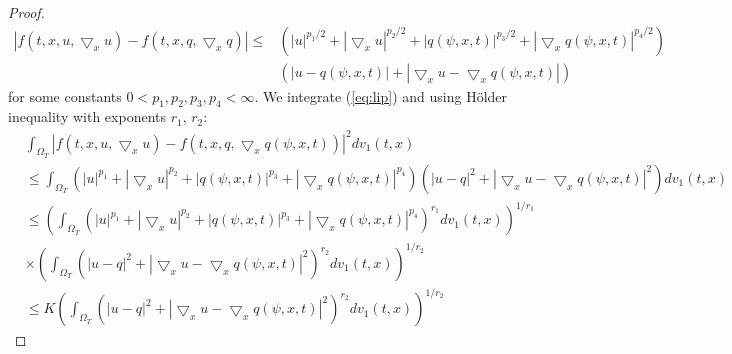 \documentclass{article}
\begin{document}
\begin{proof}
	\begin{equation}\label{eq:lip}
	\begin{aligned}
	\left|f(t,x,u,\bigtriangledown_{x}u) - f(t,x,q,\bigtriangledown_{x}q)\right| \leq &\left(|u|^{p_{1}/2} + |\bigtriangledown_{x}u|^{p_{2}/2} + |q(\psi,x,t)|^{p_{3}/2} + |\bigtriangledown_{x}q(\psi,x,t)|^{p_{4}/2}\right)  \\
	&\left(|u-q(\psi,x,t)| + |\bigtriangledown_{x}u-\bigtriangledown_{x}q(\psi,x,t)|\right)
	\end{aligned}
	\end{equation}
	for some constants $0<p_{1},p_{2},p_{3},p_{4} < \infty$. 
	We integrate (\ref{eq:lip}) and using H\"older inequality with exponents $r_{1}$, $r_{2}$:
	\begin{equation}
	\begin{aligned}
	&\int_{\Omega_{T}}\left| f(t,x,u,\bigtriangledown_{x}u) - f(t,x,q,\bigtriangledown_{x}q(\psi,x,t))\right|^{2} dv_{1}(t,x)  \\
	&\leq \int_{\Omega_{T}}\left(|u|^{p_{1}} + |\bigtriangledown_{x}u|^{p_{2}} + |q(\psi,x,t)|^{p_{3}} + |\bigtriangledown_{x}q(\psi,x,t)|^{p_{4}}\right)
	\left(|u-q|^{2} + |\bigtriangledown_{x}u-\bigtriangledown_{x}q(\psi,x,t)|^{2}\right)dv_{1}(t,x) \\
	& \leq \left(\int_{\Omega_{T}}\left(|u|^{p_{1}} + |\bigtriangledown_{x}u|^{p_{2}} + |q(\psi,x,t)|^{p_{3}} + |\bigtriangledown_{x}q(\psi,x,t)|^{p_{4}}\right)^{r_{1}}dv_{1}(t,x)\right)^{1/r_{1}}  \\
	&\times \left(\int_{\Omega_{T}}\left(|u-q|^{2} + |\bigtriangledown_{x}u-\bigtriangledown_{x}q(\psi,x,t)|^{2}\right)^{r_{2}}dv_{1}(t,x)\right)^{1/r_{2}} \\
	& \leq K  \left(\int_{\Omega_{T}}\left(|u-q|^{2} + |\bigtriangledown_{x}u-\bigtriangledown_{x}q(\psi,x,t)|^{2}\right)^{r_{2}}dv_{1}(t,x)\right)^{1/r_{2}}
	\end{aligned} \label{eq:lip_ineql}
	\end{equation}
\end{proof}
\end{document}
